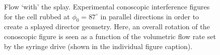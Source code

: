 \begin{figure}
\begin{center}
\end{center}
\caption[Experimental conoscopic figures for flow `with' the splay]{\label{fig:splay_with_data}Flow `with' the splay. Experimental conoscopic interference figures for the cell rubbed at $\phi_0=87^{\circ}$ in parallel directions in order to create a splayed director geometry. Here, an overall rotation of the conoscopic figure is seen as a function of the volumetric flow rate set by the syringe drive (shown in the individual figure caption).}
\end{figure}

